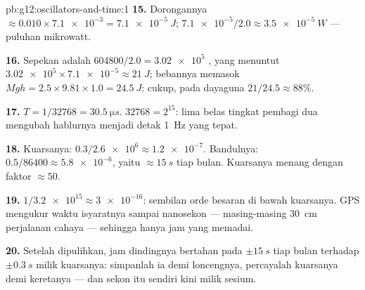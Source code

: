 \begin{solution}{pb:g12:oscillators-and-time:1}
\textbf{15.} Dorongannya $\approx 0.010 \times \num{7.1e-3} =
\qty{7.1e-5}{J}$;  $\num{7.1e-5}/2.0 \approx \qty{3.5e-5}{W}$
--- puluhan mikrowatt.

\textbf{16.} Sepekan adalah $604800/2.0 = \num{3.02e5}$ , yang menuntut
$\num{3.02e5} \times \num{7.1e-5} \approx \qty{21}{J}$; bebannya
memasok $Mgh = 2.5 \times 9.81 \times 1.0 = \qty{24.5}{J}$: cukup,
pada dayaguna $21/24.5 \approx 88\%$.

\textbf{17.} $T = 1/\num{32768} = \qty{30.5}{\micro s}$. $\num{32768}
= 2^{15}$: lima belas tingkat pembagi dua mengubah  hablurnya
menjadi detak \qty{1}{Hz} yang tepat.

\textbf{18.} Kuarsanya: $0.3/\num{2.6e6} \approx \num{1.2e-7}$.
Bandulnya: $0.5/86400 \approx \num{5.8e-6}$, yaitu $\approx
\qty{15}{s}$ tiap bulan. Kuarsanya menang dengan faktor $\approx 50$.

\textbf{19.} $1/\num{3.2e15} \approx \num{3e-16}$: sembilan orde
besaran di bawah kuarsanya. GPS mengukur waktu isyaratnya sampai nanosekon ---
masing-masing \qty{30}{cm} perjalanan cahaya --- sehingga hanya jam  yang memadai.

\textbf{20.} Setelah dipulihkan, jam dindingnya bertahan pada $\pm\qty{15}{s}$ tiap
bulan terhadap $\pm\qty{0.3}{s}$ milik kuarsanya: simpanlah ia demi
loncengnya, percayalah kuarsanya demi keretanya --- dan sekon itu sendiri kini
milik  sesium.
\end{solution}

